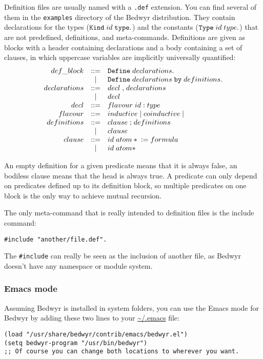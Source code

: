 \documentclass{article}
\begin{document}
Definition files are usually named with a \verb|.def| extension.
You can find several of them in the \verb.examples. directory
of the Bedwyr distribution.
They contain declarations for the types (${\tt Kind}\;id\;{\tt type.}$)
and the constants (${\tt Type}\;id\;type{\tt .}$) that are not
predefined, definitions, and meta-commands.
Definitions are given as blocks with a header containing declarations
and a body containing a set of clauses, in which uppercase variables are
implicitly universally quantified:
\[\begin{array}{rcl}
  def\_block    &::=& {\tt Define}\;declarations{\tt .} \\
                & | & {\tt Define}\;declarations\;{\tt by}\;
                     definitions{\tt.} \\
  declarations  &::=& decl\;{\tt,}\;declarations \\
                & | & decl\\
  decl          &::=& flavour\;id\;{\tt :}\;type \\
  flavour       &::=& inductive\;|\;coinductive\;|\\
  definitions   &::=& clause\;{\tt;}\;definitions \\
                & | & clause\\
  clause        &::=& id\;atom*\;{\tt:=}\;formula \\
                & | & id\;atom* \\
\end{array}\]

An empty definition for a given predicate means that it is always false,
an bodiless clause means that the head is always true.
A predicate can only depend on predicates defined up to its definition
block, so multiple predicates on one block is the only way to achieve
mutual recursion.

The only meta-command that is really intended to definition files is the
include command:
\begin{verbatim}#include "another/file.def".\end{verbatim}
The \verb.#include. can really be seen as the inclusion of another file,
as Bedwyr doesn't have any namespace or module system.

\subsubsection{Emacs mode}

Assuming Bedwyr is installed in system folders, you can use the Emacs
mode for Bedwyr by adding these two lines to your \url{~/.emacs} file:
\begin{verbatim}
(load "/usr/share/bedwyr/contrib/emacs/bedwyr.el")
(setq bedwyr-program "/usr/bin/bedwyr")
;; Of course you can change both locations to wherever you want.
\end{verbatim}
\end{document}
